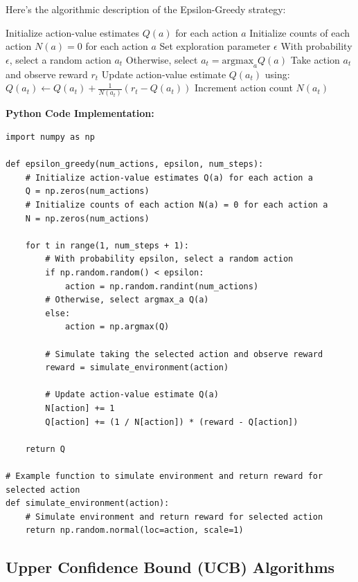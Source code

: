 \documentclass[12pt]{book} %
\begin{document}
Here's the algorithmic description of the Epsilon-Greedy strategy:
\FloatBarrier
\begin{algorithm}
\caption{Epsilon-Greedy Strategy}\label{alg:epsilon_greedy}
\begin{algorithmic}[1]
\State Initialize action-value estimates \(Q(a)\) for each action \(a\)
\State Initialize counts of each action \(N(a) = 0\) for each action \(a\)
\State Set exploration parameter \(\epsilon\)
    \State With probability \(\epsilon\), select a random action \(a_t\)
    \State Otherwise, select \(a_t = \text{argmax}_{a} Q(a)\)
    \State Take action \(a_t\) and observe reward \(r_t\)
    \State Update action-value estimate \(Q(a_t)\) using:
    \State \quad \(Q(a_t) \leftarrow Q(a_t) + \frac{1}{N(a_t)}(r_t - Q(a_t))\)
    \State Increment action count \(N(a_t)\)
\EndFor
\end{algorithmic}
\end{algorithm}
\FloatBarrier
\textbf{Python Code Implementation:}
\FloatBarrier
\begin{lstlisting}
import numpy as np

def epsilon_greedy(num_actions, epsilon, num_steps):
    # Initialize action-value estimates Q(a) for each action a
    Q = np.zeros(num_actions)
    # Initialize counts of each action N(a) = 0 for each action a
    N = np.zeros(num_actions)

    for t in range(1, num_steps + 1):
        # With probability epsilon, select a random action
        if np.random.random() < epsilon:
            action = np.random.randint(num_actions)
        # Otherwise, select argmax_a Q(a)
        else:
            action = np.argmax(Q)

        # Simulate taking the selected action and observe reward
        reward = simulate_environment(action)

        # Update action-value estimate Q(a)
        N[action] += 1
        Q[action] += (1 / N[action]) * (reward - Q[action])

    return Q

# Example function to simulate environment and return reward for selected action
def simulate_environment(action):
    # Simulate environment and return reward for selected action
    return np.random.normal(loc=action, scale=1)
\end{lstlisting}

\subsection{Upper Confidence Bound (UCB) Algorithms}
\end{document}
